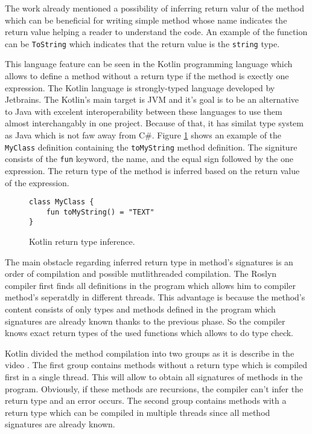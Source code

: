 The work already mentioned a possibility of inferring return valur of the method which can be beneficial for writing simple method whose name indicates the return value helping a reader to understand the code.
An example of the function can be \texttt{ToString} which indicates that the return value is the \texttt{string} type.
\par
This language feature can be seen in the Kotlin programming language which allows to define a method without a return type if the method is exectly one expression.
The Kotlin language is strongly-typed language  developed by Jetbrains.
The Kotlin's main target is JVM and it's goal is to be an alternative to Java with excelent interoperability between these languages to use them almost interchangably in one project.
Because of that, it has similat type system as Java which is not faw away from C\#.
Figure \ref{img64:kotlin} shows an example of the \texttt{MyClass} definition containing the \texttt{toMyString} method definition.
The signiture consists of the \texttt{fun} keyword, the name, and the equal sign followed by the one expression.
The return type of the method is inferred based on the return value of the expression. 
\begin{figure}[h!]
\begin{lstlisting}[style=csharp, mathescape=true]
class MyClass {
    fun toMyString() = "TEXT"
}
\end{lstlisting}
\caption{Kotlin return type inference.}
\label{img64:kotlin}
\end{figure}
\par
The main obstacle regarding inferred return type in method's signatures is an order of compilation and possible mutlithreaded compilation.
The Roslyn compiler first finds all definitions in the program which allows him to compiler method's seperatdly in different threads.
This advantage is because the method's content consists of only types and methods defined in the program which signatures are already known thanks to the previous phase.
So the compiler knows exact return types of the used functions which allows to do type check.
\par
Kotlin divided the method compilation into two groups as it is describe in the video \cite{online:kotlinCompiler}.
The first group contains methods without a return type which is compiled first in a single thread.
This will allow to obtain all signatures of methods in the program.
Obviously, if these methods are recursions, the compiler can't infer the return type and an error occurs.
The second group contains methods with a return type which can be compiled in multiple threads since all method signatures are already known.
